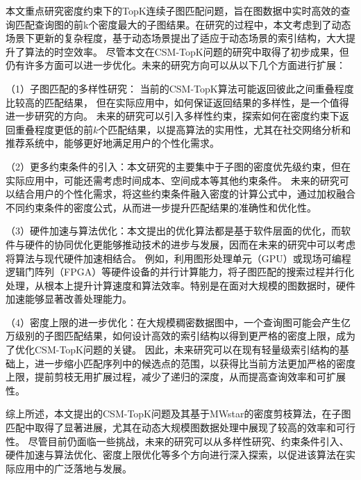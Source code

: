 \begin{summary}
	本文重点研究密度约束下的TopK连续子图匹配问题，旨在图数据中实时高效的查询匹配查询图的前k个密度最大的子图结果。在研究的过程中，本文考虑到了动态场景下更新的复杂程度，基于动态场景提出了适应于动态场景的索引结构，大大提升了算法的时空效率。
	尽管本文在CSM-TopK问题的研究中取得了初步成果，但仍有许多方面可以进一步优化。未来的研究方向可以从以下几个方面进行扩展：

		（1）子图匹配的多样性研究：
		当前的CSM-TopK算法可能返回彼此之间重叠程度比较高的匹配结果，
		但在实际应用中，如何保证返回结果的多样性，是一个值得进一步研究的方向。
		未来的研究可以引入多样性约束，探索如何在密度约束下返回重叠程度更低的前$k$个匹配结果，以提高算法的实用性，尤其在社交网络分析和推荐系统中，能够更好地满足用户的个性化需求。

		（2）更多约束条件的引入：本文研究的主要集中于子图的密度优先级约束，但在实际应用中，可能还需考虑时间成本、空间成本等其他约束条件。
		未来的研究可以结合用户的个性化需求，将这些约束条件融入密度的计算公式中，通过加权融合不同约束条件的密度公式，从而进一步提升匹配结果的准确性和优化性。

		（3）硬件加速与算法优化：本文提出的优化算法都是基于软件层面的优化，而软件与硬件的协同优化更能够推动技术的进步与发展，因而在未来的研究中可以考虑将算法与现代硬件加速相结合。
		例如，利用图形处理单元（GPU）或现场可编程逻辑门阵列（FPGA）等硬件设备的并行计算能力，将子图匹配的搜索过程并行化处理，从根本上提升计算速度和算法效率。特别是在面对大规模的图数据时，硬件加速能够显著改善处理能力。

		（4）密度上限的进一步优化：在大规模稠密数据图中，一个查询图可能会产生亿万级别的子图匹配结果，如何设计高效的索引结构以得到更严格的密度上限，成为了优化CSM-TopK问题的关键。
		因此，未来研究可以在现有轻量级索引结构的基础上，进一步缩小匹配序列中的候选点的范围，以获得比当前方法更加严格的密度上限，提前剪枝无用扩展过程，减少了递归的深度，从而提高查询效率和可扩展性。

	综上所述，本文提出的CSM-TopK问题及其基于MWstar的密度剪枝算法，在子图匹配中取得了显著进展，尤其在动态大规模图数据处理中展现了较高的效率和可行性。
	尽管目前仍面临一些挑战，未来的研究可以从多样性研究、约束条件引入、硬件加速与算法优化、密度上限优化等多个方向进行深入探索，以促进该算法在实际应用中的广泛落地与发展。
\end{summary}
